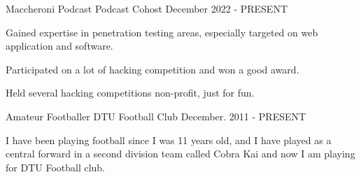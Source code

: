 

\begin{cventries}

  \cventry
    {Maccheroni Podcast} %
    {Podcast Cohost} %
    {} %
    {December 2022 - PRESENT} %
    {
      \begin{cvitems} %
        \item {Gained expertise in penetration testing areas, especially targeted on web application and software.}
        \item {Participated on a lot of hacking competition and won a good award.}
        \item {Held several hacking competitions non-profit, just for fun.}
      \end{cvitems}
    }

  \cventry
    {Amateur Footballer} %
    {DTU Football Club} %
    {} %
    {December. 2011 - PRESENT} %
    {
      \begin{cvitems} %
        \item {I have been playing football since I was 11 years old, and I have played as a central forward in a second division team called Cobra Kai and now I am playing for DTU Football club.}
      \end{cvitems}
    }

\end{cventries}
